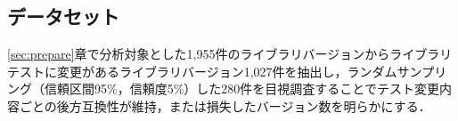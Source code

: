 \documentclass[submit]{ipsj}
\begin{document}



\subsection{データセット}\label{rq1:datasets}

\ref{sec:prepare}章で分析対象とした1,955件のライブラリバージョンからライブラリテストに変更があるライブラリバージョン1,027件を抽出し，ランダムサンプリング（信頼区間95\%，信頼度5\%）した280件を目視調査することでテスト変更内容ごとの後方互換性が維持，または損失したバージョン数を明らかにする．
\end{document}

